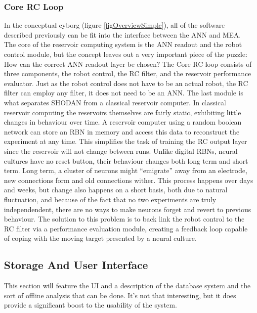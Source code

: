 \subsubsection{Core RC Loop}
In the conceptual cyborg (figure \ref{figOverviewSimple}), all of the software
described previously can be fit into the interface between the ANN and MEA.
The core of the reservoir computing system is the ANN readout and the robot
control module, but the concept leaves out a very important piece of the puzzle:
How can the correct ANN readout layer be chosen?
The Core RC loop consists of three components, the robot control, the RC
filter, and the reservoir performance evaluator.
Just as the robot control does not have to be an actual robot, the RC filter
can employ any filter, it does not need to be an ANN.
The last module is what separates SHODAN from a classical reservoir computer.
In classical reservoir computing the reservoirs themselves are fairly static,
exhibiting little changes in behaviour over time.
A reservoir computer using a random boolean network can store an RBN in memory
and access this data to reconstruct the experiment at any time.
This simplifies the task of training the RC output layer since the reservoir
will not change between runs.
Unlike digital RBNs, neural cultures have no reset button, their behaviour
changes both long term and short term.
Long term, a cluster of neurons might ``emigrate'' away from an electrode, new
connections form and old connections wither.
This process happens over days and weeks, but change also happens on a short
basis, both due to natural fluctuation, and because of the fact that no two
experiments are truly independendent, there are no ways to make neurons forget
and revert to previous behaviour.
The solution to this problem is to back link the robot control to the RC filter
via a performance evaluation module, creating a feedback loop capable of coping
with the moving target presented by a neural culture.\par
\subsection{Storage And User Interface}
This section will feature the UI and a description of the database system and
the sort of offline analysis that can be done.
It's not that interesting, but it does provide a significant boost to the
usability of the system.
%
